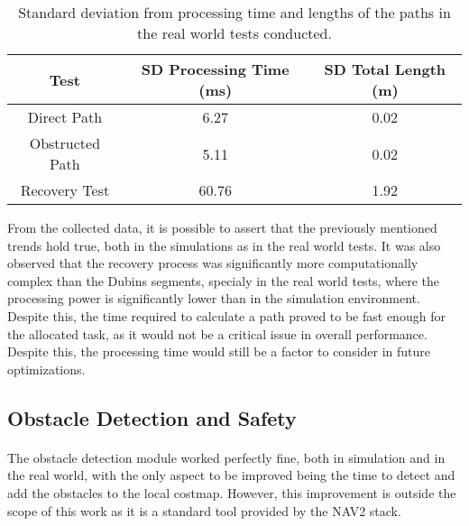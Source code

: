 \begin{table}[H]
    \centering
    \caption{Standard deviation from processing time and lengths of the paths in the real world tests conducted.}
    \begin{tabular}{|c|c|c|}
        \hline
        \textbf{Test}  & \textbf{SD Processing Time (ms)} & \textbf{SD Total Length (m)}\\
        \hline
        Direct Path & 6.27 & 0.02  \\
        \hline
        Obstructed Path & 5.11 & 0.02  \\
        \hline
        Recovery Test & 60.76  & 1.92  \\
        \hline
    \end{tabular}
    \label{tab:mean_processing_time_lengths2}
\end{table}

From the collected data, it is possible to assert that the previously mentioned trends hold true, both in 
the simulations as in the real world tests. It was also observed that the recovery process was significantly 
more computationally complex than the Dubins segments, specialy in the real world tests, where the processing power 
is significantly lower than in the simulation environment. Despite this, the time required to calculate a path proved 
to be fast enough for the allocated task, as it would not be a critical issue in overall performance. Despite this, 
the processing time would still be a factor to consider in future optimizations.

\subsection{Obstacle Detection and Safety}
\paragraph{} The obstacle detection module worked perfectly fine, both in simulation and in the real world, 
with the only aspect to be improved being the time to detect and add the obstacles to the local costmap. However, 
this improvement is outside the scope of this work as it is a standard tool provided by the \gls{NAV2} stack.